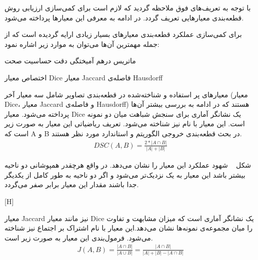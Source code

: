 
با توجه به تعریف‌های فوق ملاحظه گردید که لازم است برای کمی‌سازی ارزیابی روش قطعه‌بندی  معیارهایی تعریف گردد. در ادامه به معرفی این معیارها پرداخته می‌شود.

برای کمی‌سازی عملکرد قطعه‌بندی معیارهای بسیار زیادی ارایه گردیده است که از جمله مهمترین آن‌ها می‌توان به موارد زیر اشاره نمود:

\begin{multicols}{2}
	 ماتریس درهم آمیختگی
	 دقت
	 حساسیت
	 صحت
	
	  اختصاص
	 معیار Dice
	 معیار Jaccard
	 فاصله‌ی Hausdorff
	
\end{multicols}

معیارهای پر استفاده و شناخته‌شده در قطعه‌بندی تصاویر شامل سه معیار آخر (معیار Dice، معیار Jaccard و فاصله‌ی Hausdorff) هستند که در ادامه به بررسی بیشتر آن‌ها پرداخته می‌شود.
معیار Dice یک نشانگر آماری برای سنجش شباهت میان دو نمونه است. این معیار با نام  نیز شناخته می‌شود. تعریف ریاضیاتی این معیار به صورت زیر است که A و B در بحث قطعه‌بندی خروجی الگوریتم و استاندارد مورد نظر هستند.
\begin{alignat}{5}
	DSC(A, B) = \frac{2*|A \cap B|}{|A|+|B|}    \label{dsc_def}
\end{alignat}

شکل ~ شهود عملکرد این معیار را نشان می‌دهد. در واقع هرچقدر همپوشانی دو ناحیه بیشتر باشد این معیار به یک نزدیک‌تر می‌شود و اگر دو ناحیه به طور کامل از یکدیگر جدا باشند مقدار این معیار برابر صفر می‌گردد.

[H]

معیار Jaccard نیز مانند معیار Dice یک نشانگر آماری است که میزان مشابهت و تفاوت را میان مجموعه‌ی نمونه‌ها نشان می‌دهد.این معیار با نام اشتراک بر اجتماع نیز شناخته می‌شود. فرمول‌بندی این معیار به صورت زیر است.
\begin{alignat}{5}
	J(A, B) = \frac{|A \cap B|}{|A \cup B|} = \frac{|A \cap B|}{|A| + |B| - |A \cap B|}   \label{jacc_def}
\end{alignat}

